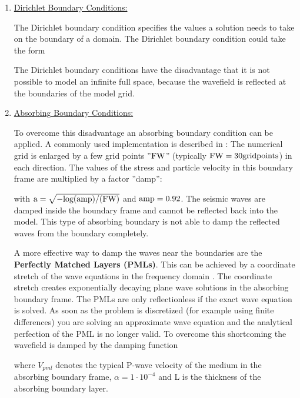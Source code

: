 \documentclass{hitec}
\begin{document}
\begin{enumerate}

\item \underline{Dirichlet Boundary Conditions:}

The Dirichlet boundary condition specifies the values a solution needs to take on the boundary of a domain.
The Dirichlet boundary condition could take the form


The Dirichlet boundary conditions have the disadvantage that it is not possible to model an infinite full space, because the wavefield is reflected at the boundaries of the model grid.

\item \underline{Absorbing Boundary Conditions:}

To overcome this disadvantage an absorbing boundary condition can be applied. A commonly used implementation is described in \cite{cerjan:85}: The numerical grid is enlarged by a few grid points ''$\rm{FW}$'' (typically $\rm{FW=30 gridpoints}$) in each direction. The values of the stress and particle velocity in this boundary frame are multiplied by a factor ''damp'':


with $\rm{a=\sqrt{-log(amp)/(FW)}}$ and $\rm{amp=0.92}$. The seismic waves are damped inside the boundary frame and cannot be reflected back into the model. This type of absorbing boundary
is not able to damp the reflected waves from the boundary completely.

A more effective way to damp the waves near the boundaries are the {\bf{Perfectly Matched Layers (PMLs)}}. This can be achieved by a coordinate stretch of the wave equations in the frequency domain \cite{komatitsch:07}. The coordinate stretch creates exponentially decaying plane wave solutions in the absorbing boundary frame. The PMLs are only reflectionless if the exact wave equation is solved. As soon as the problem is discretized (for example using finite differences) you are solving an approximate wave equation and the analytical perfection of the PML is no longer valid. To overcome this shortcoming the wavefield is damped by the damping function 


where $V_{pml}$ denotes the typical P-wave velocity of the medium in the absorbing boundary frame, $\alpha=1 \cdot 10^{-4}$ and L is the thickness of the absorbing boundary layer.

\end{enumerate} 
\clearpage
\end{document}
